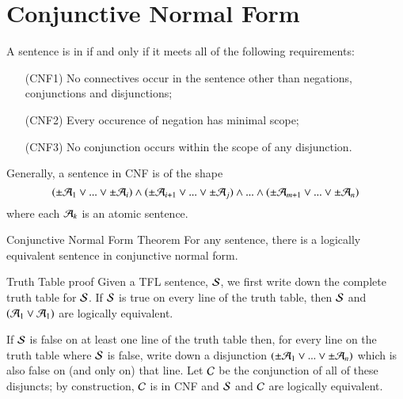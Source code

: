 \documentclass[12pt, a4paper, twoside, openright, titlepage]{book}
\begin{document}
\section{\textsection Conjunctive Normal Form}

\begin{defn}{}{}
    A sentence is in  if and only if it meets all of the following requirements: \begin{itemize}[leftmargin=+1in]
        \item[(CNF1)] No connectives occur in the sentence other than negations, conjunctions and disjunctions;
        \item[(CNF2)] Every occurence of negation has minimal scope;
        \item[(CNF3)] No conjunction occurs within the scope of any disjunction.
    \end{itemize}
\end{defn}

\begin{rmk}{}{}
    Generally, a sentence in CNF is of the shape \begin{equation*}
        (\pm\mathcal{A}_1\vee ...\vee\pm\mathcal{A}_i)\wedge(\pm\mathcal{A}_{i+1}\vee ...\vee\pm\mathcal{A}_j)\wedge...\wedge(\pm\mathcal{A}_{m+1}\vee ...\vee\pm\mathcal{A}_n)
    \end{equation*}
    where each $\mathcal{A}_k$ is an atomic sentence.
\end{rmk}

\begin{namthm}{Conjunctive Normal Form Theorem}{}
    For any sentence, there is a logically equivalent sentence in conjunctive normal form.
\end{namthm}
\begin{proof*}{Truth Table proof}{}
    Given a TFL sentence, $\mathcal{S}$, we first write down the complete truth table for $\mathcal{S}$. If $\mathcal{S}$ is true on every line of the truth table, then $\mathcal{S}$ and $(\mathcal{A}_1\vee\mathcal{A}_1)$ are logically equivalent.

    If $\mathcal{S}$ is false on at least one line of the truth table then, for every line on the truth table where $\mathcal{S}$ is false, write down a disjunction $(\pm\mathcal{A}_1\vee...\vee\pm\mathcal{A}_n)$ which is also false on (and only on) that line. Let $\mathcal{C}$ be the conjunction of all of these disjuncts; by construction, $\mathcal{C}$ is in CNF and $\mathcal{S}$ and $\mathcal{C}$ are logically equivalent.
\end{proof*}
\end{document}
